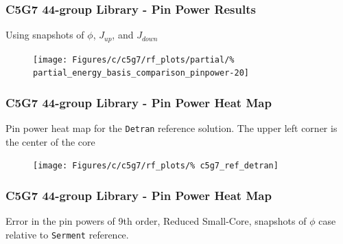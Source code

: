 \documentclass[fleqn]{beamer}
\begin{document}
    \begin{frame}
        \frametitle{C5G7 44-group Library - Pin Power Results}
        \centering
        Using snapshots of $\phi$, $J_{up}$, and $J_{down}$
        \begin{figure}
            \texttt{[image: Figures/c/c5g7/rf\_plots/partial/\%
                partial\_energy\_basis\_comparison\_pinpower-20]}
        \end{figure}
    \end{frame}

    \begin{frame}
        \frametitle{C5G7 44-group Library - Pin Power Heat Map}
        \centering
        Pin power heat map for the {\tt Detran} reference solution.  The
        upper left corner is the center of the core
        \begin{figure}
            \texttt{[image: Figures/c/c5g7/rf\_plots/\%
                c5g7\_ref\_detran]}
        \end{figure}
    \end{frame}

        \begin{frame}
            \frametitle{C5G7 44-group Library - Pin Power Heat Map}
            \centering
            Error in the pin powers of 9th order, Reduced Small-Core, snapshots
            of
            $\phi$ case relative to {\tt Serment}
            reference.
            \begin{columns}[T]
                \begin{column}{0.5\textwidth}
                    \begin{figure}
                    \end{figure}
                \end{column}
                \begin{column}{0.5\textwidth}
                    \begin{figure}
                    \end{figure}
                \end{column}
            \end{columns}
        \end{frame}
\end{document}
